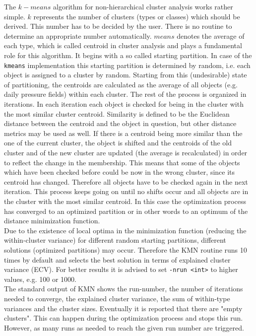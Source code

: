 \documentclass[12pt, oneside, a4paper, headsepline, plainheadsepline]{scrbook}
\begin{document}
The $k-means$ algorithm for non-hierarchical cluster analysis works rather simple.
$k$ represents the number of clusters (types or classes) which should be derived. 
This number has to be decided by the user. There is no routine to determine an 
appropriate number automatically.
$means$ denotes the average of each type, which is called centroid in cluster analysis
and plays a fundamental role for this algorithm.
It begins with a so called starting partition. In case of the \verb+kmeans+ implementation
this starting partition is determined by random, i.e. each object is assigned to a cluster
by random. Starting from this (undesirable) state of partitioning, the centroids are calculated
as the average of all objects (e.g. daily pressure fields) within each cluster.
The rest of the process is organized in iterations. In each iteration each object is checked
for being in the cluster with the most similar cluster centroid. Similarity is defined to be the 
Euclidean distance between the centroid and the object in question, but other distance metrics may be used as well. If there is a centroid being
more similar than the one of the current cluster, the object is shifted and the centroids of
the old cluster and of the new cluster are updated (the average is recalculated) in order
to reflect the change in the membership. This means that some of the objects which have been
checked before could be now in the wrong cluster, since its centroid has changed. Therefore
all objects have to be checked again in the next iteration. This process keeps going on
until no shifts occur and all objects are in the cluster with the most similar centroid.
In this case the optimization process has converged to an optimized partition or in other words
to an optimum of the distance minimization function.\\
Due to the existence of local optima in the minimization function (reducing the within-cluster 
variance) for different random starting partitions, different solutions (optimized partitions)
may occur. Therefore the KMN routine runs 10 times by default and selects the best solution in
terms of explained cluster variance (ECV). For better results it is advised to set \verb+-nrun <int>+ to higher values, e.g. 100 or 1000.\\
The standard output of KMN shows the run-number, the number of iterations needed to converge, the explained cluster variance, the sum of within-type variances and the cluster sizes. Eventually it is reported that there are "empty clusters". This can happen during the optimization process and stops this run. However, as many runs as needed to
reach the given run number are triggered.
\end{document}
